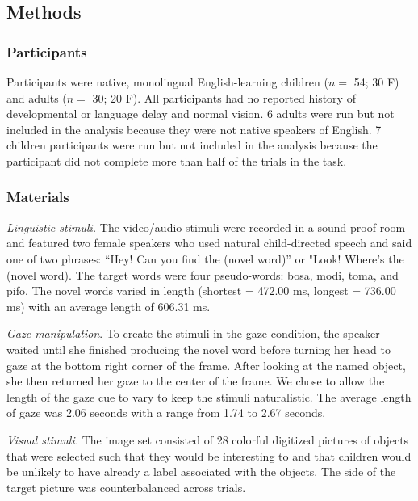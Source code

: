 \documentclass[10pt, letterpaper]{article}
\begin{document}
\hypertarget{methods-1}{%
\subsection{Methods}\label{methods-1}}

\hypertarget{participants-1}{%
\subsubsection{Participants}\label{participants-1}}

Participants were native, monolingual English-learning children (\(n=\)
54; 30 F) and adults (\(n=\) 30; 20 F). All participants had no reported
history of developmental or language delay and normal vision. 6 adults
were run but not included in the analysis because they were not native
speakers of English. 7 children participants were run but not included
in the analysis because the participant did not complete more than half
of the trials in the task.

\hypertarget{materials-1}{%
\subsubsection{Materials}\label{materials-1}}

\emph{Linguistic stimuli.} The video/audio stimuli were recorded in a
sound-proof room and featured two female speakers who used natural
child-directed speech and said one of two phrases: ``Hey! Can you find
the (novel word)'' or "Look! Where's the (novel word). The target words
were four pseudo-words: bosa, modi, toma, and pifo. The novel words
varied in length (shortest = 472.00 ms, longest = 736.00 ms) with an
average length of 606.31 ms.

\emph{Gaze manipulation}. To create the stimuli in the gaze condition,
the speaker waited until she finished producing the novel word before
turning her head to gaze at the bottom right corner of the frame. After
looking at the named object, she then returned her gaze to the center of
the frame. We chose to allow the length of the gaze cue to vary to keep
the stimuli naturalistic. The average length of gaze was 2.06 seconds
with a range from 1.74 to 2.67 seconds.

\emph{Visual stimuli.} The image set consisted of 28 colorful digitized
pictures of objects that were selected such that they would be
interesting to and that children would be unlikely to have already a
label associated with the objects. The side of the target picture was
counterbalanced across trials.
\end{document}
